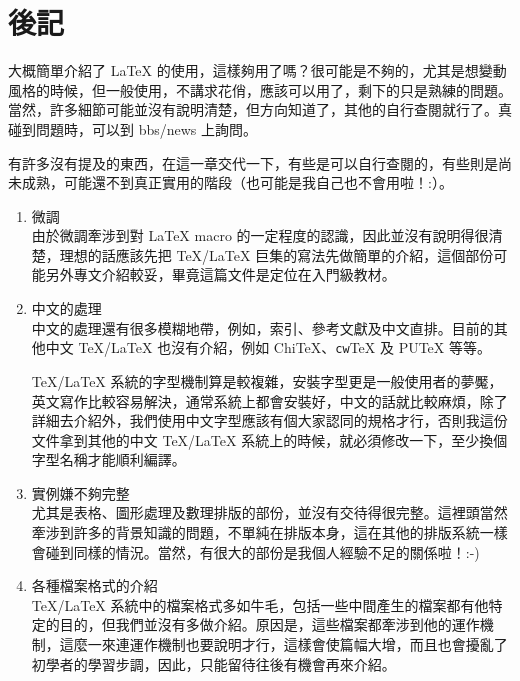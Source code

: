 
\chapter{後記}

大概簡單介紹了 \LaTeX{} 的使用，這樣夠用了嗎？很可能是不夠的，尤其是想變動風格的時候，但一般使用，不講求花俏，應該可以用了，剩下的只是熟練的問題。當然，許多細節可能並沒有說明清楚，但方向知道了，其他的自行查閱就行了。真碰到問題時，可以到 bbs/news 上詢問。

有許多沒有提及的東西，在這一章交代一下，有些是可以自行查閱的，有些則是尚未成熟，可能還不到真正實用的階段（也可能是我自己也不會用啦！:）。

\begin{enumerate}

  \item 微調 \\
  由於微調牽涉到對 \LaTeX{} macro 的一定程度的認識，因此並沒有說明得很清楚，理想的話應該先把 \TeX{}/\LaTeX{} 巨集的寫法先做簡單的介紹，這個部份可能另外專文介紹較妥，畢竟這篇文件是定位在入門級教材。

  \item 中文的處理 \\
  中文的處理還有很多模糊地帶，例如，索引、參考文獻及中文直排。目前的其他中文 \TeX{}/\LaTeX{} 也沒有介紹，例如 Chi\TeX{}、\texttt{cw}\TeX{} 及 PU\TeX{} 等等。

  \TeX{}/\LaTeX{} 系統的字型機制算是較複雜，安裝字型更是一般使用者的夢魘，英文寫作比較容易解決，通常系統上都會安裝好，中文的話就比較麻煩，除了詳細去介紹外，我們使用中文字型應該有個大家認同的規格才行，否則我這份文件拿到其他的中文 \TeX{}/\LaTeX{} 系統上的時候，就必須修改一下，至少換個字型名稱才能順利編譯。

  \item 實例嫌不夠完整 \\
  尤其是表格、圖形處理及數理排版的部份，並沒有交待得很完整。這裡頭當然牽涉到許多的背景知識的問題，不單純在排版本身，這在其他的排版系統一樣會碰到同樣的情況。當然，有很大的部份是我個人經驗不足的關係啦！:-)

  \item 各種檔案格式的介紹 \\
  \TeX{}/\LaTeX{} 系統中的檔案格式多如牛毛，包括一些中間產生的檔案都有他特定的目的，但我們並沒有多做介紹。原因是，這些檔案都牽涉到他的運作機制，這麼一來連運作機制也要說明才行，這樣會使篇幅大增，而且也會擾亂了初學者的學習步調，因此，只能留待往後有機會再來介紹。


\end{enumerate}
